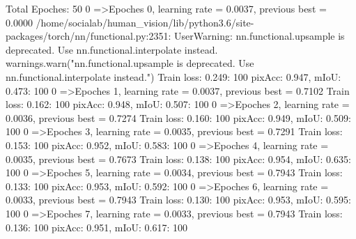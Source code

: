 Total Epoches: 50
  0%
=>Epoches 0, learning rate = 0.0037,                 previous best = 0.0000
/home/socialab/human_vision/lib/python3.6/site-packages/torch/nn/functional.py:2351: UserWarning: nn.functional.upsample is deprecated. Use nn.functional.interpolate instead.
  warnings.warn("nn.functional.upsample is deprecated. Use nn.functional.interpolate instead.")
Train loss: 0.249: 100%
pixAcc: 0.947, mIoU: 0.473: 100%
  0%
=>Epoches 1, learning rate = 0.0037,                 previous best = 0.7102
Train loss: 0.162: 100%
pixAcc: 0.948, mIoU: 0.507: 100%
  0%
=>Epoches 2, learning rate = 0.0036,                 previous best = 0.7274
Train loss: 0.160: 100%
pixAcc: 0.949, mIoU: 0.509: 100%
  0%
=>Epoches 3, learning rate = 0.0035,                 previous best = 0.7291
Train loss: 0.153: 100%
pixAcc: 0.952, mIoU: 0.583: 100%
  0%
=>Epoches 4, learning rate = 0.0035,                 previous best = 0.7673
Train loss: 0.138: 100%
pixAcc: 0.954, mIoU: 0.635: 100%
  0%
=>Epoches 5, learning rate = 0.0034,                 previous best = 0.7943
Train loss: 0.133: 100%
pixAcc: 0.953, mIoU: 0.592: 100%
  0%
=>Epoches 6, learning rate = 0.0033,                 previous best = 0.7943
Train loss: 0.130: 100%
pixAcc: 0.953, mIoU: 0.595: 100%
  0%
=>Epoches 7, learning rate = 0.0033,                 previous best = 0.7943
Train loss: 0.136: 100%
pixAcc: 0.951, mIoU: 0.617: 100%

